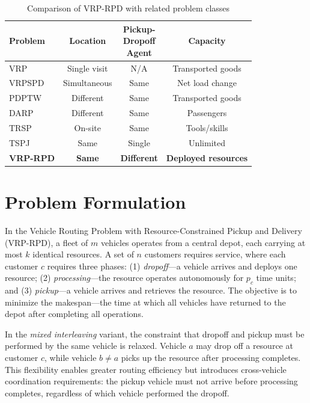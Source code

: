 \documentclass[sigconf]{acmart}
\begin{document}
\begin{table}[t]
\caption{Comparison of VRP-RPD with related problem classes}
\label{tab:comparison}
\small
\begin{tabular}{lccc}
\toprule
Problem & Location & \makecell{Pickup-\\Dropoff\\Agent} & Capacity \\
\midrule
VRP & Single visit & N/A & Transported goods \\
VRPSPD & Simultaneous & Same & Net load change \\
PDPTW & Different & Same & Transported goods \\
DARP & Different & Same & Passengers \\
TRSP & On-site & Same & Tools/skills \\
TSPJ & Same & Single & Unlimited \\
\textbf{VRP-RPD} & \textbf{Same} & \textbf{Different} & \textbf{Deployed resources} \\
\bottomrule
\end{tabular}
\end{table}

\section{Problem Formulation}

In the Vehicle Routing Problem with Resource-Constrained Pickup and Delivery (VRP-RPD), a fleet of $m$ vehicles operates from a central depot, each carrying at most $k$ identical resources. A set of $n$ customers requires service, where each customer $c$ requires three phases: (1) \emph{dropoff}---a vehicle arrives and deploys one resource; (2) \emph{processing}---the resource operates autonomously for $p_c$ time units; and (3) \emph{pickup}---a vehicle arrives and retrieves the resource. The objective is to minimize the makespan---the time at which all vehicles have returned to the depot after completing all operations.

In the \emph{mixed interleaving} variant, the constraint that dropoff and pickup must be performed by the same vehicle is relaxed. Vehicle $a$ may drop off a resource at customer $c$, while vehicle $b \neq a$ picks up the resource after processing completes. This flexibility enables greater routing efficiency but introduces cross-vehicle coordination requirements: the pickup vehicle must not arrive before processing completes, regardless of which vehicle performed the dropoff.
\end{document}
